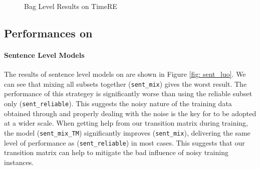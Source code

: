 \begin{figure}[htbp]
\centering
{}
\caption{Bag Level Results on TimeRE}
\label{fig: results_on_luo}
\end{figure}

\subsection{Performances on \TimeRE}
\paragraph{Sentence Level Models}
The results of sentence level models on \TimeRE are shown in Figure \ref{fig:
sent_luo}. We can see that mixing all subsets together (\texttt{sent\_mix})
gives the worst result. The performance of this strategey is significantly
worse than using the reliable subset only (\texttt{sent\_reliable}). This
suggests the noisy nature of the training data obtained through \DS and
properly dealing with the noise is the key for \DS to be adopted at a wider
scale. When getting help from our transition matrix during training, the
model (\texttt{sent\_mix\_TM}) significantly improves (\texttt{sent\_mix}),
delivering the same level of performance as (\texttt{sent\_reliable}) in most
cases. This suggests that our transition matrix can help to mitigate the bad influence of noisy training instances.


